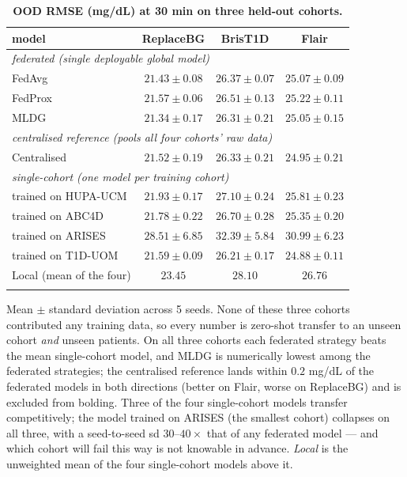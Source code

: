 \documentclass[10pt,letterpaper]{article}
\newlength\savedwidth
\newcommand\thickhline{\noalign{\global\savedwidth\arrayrulewidth\global\arrayrulewidth 2pt}%
\hline
\noalign{\global\arrayrulewidth\savedwidth}}
\begin{document}
\begin{table}[!ht]
\centering
\captionsetup{justification=centering,singlelinecheck=on}
\caption{\bf OOD RMSE (mg/dL) at 30 min on three held-out cohorts.}
\label{tab:ood}
\begin{tabular}{lccc}
\thickhline
model & ReplaceBG & BrisT1D & Flair \\
\hline
\multicolumn{4}{l}{\emph{federated (single deployable global model)}} \\
FedAvg  & $21.43 \pm 0.08$ & $26.37 \pm 0.07$ & $25.07 \pm 0.09$ \\
FedProx & $21.57 \pm 0.06$ & $26.51 \pm 0.13$ & $25.22 \pm 0.11$ \\
MLDG    & $\mathbf{21.34 \pm 0.17}$ & $\mathbf{26.31 \pm 0.21}$ & $\mathbf{25.05 \pm 0.15}$ \\
\hline
\multicolumn{4}{l}{\emph{centralised reference (pools all four cohorts' raw data)}} \\
Centralised & $21.52 \pm 0.19$ & $26.33 \pm 0.21$ & $24.95 \pm 0.21$ \\
\hline
\multicolumn{4}{l}{\emph{single-cohort (one model per training cohort)}} \\
\;trained on HUPA-UCM & $21.93 \pm 0.17$ & $27.10 \pm 0.24$ & $25.81 \pm 0.23$ \\
\;trained on ABC4D    & $21.78 \pm 0.22$ & $26.70 \pm 0.28$ & $25.35 \pm 0.20$ \\
\;trained on ARISES   & $28.51 \pm 6.85$ & $32.39 \pm 5.84$ & $30.99 \pm 6.23$ \\
\;trained on T1D-UOM  & $21.59 \pm 0.09$ & $26.21 \pm 0.17$ & $24.88 \pm 0.11$ \\
Local (mean of the four) & $23.45$ & $28.10$ & $26.76$ \\
\thickhline
\end{tabular}
\begin{center}
{\small Mean $\pm$ standard deviation across 5 seeds. None of these three cohorts
contributed any training data, so every number is zero-shot transfer to an unseen
cohort \emph{and} unseen patients. On all three cohorts each federated strategy
beats the mean single-cohort model, and MLDG is numerically lowest among the
federated strategies; the centralised reference lands within $0.2$ mg/dL of the
federated models in both directions (better on Flair, worse on ReplaceBG) and is
excluded from bolding. Three of the
four single-cohort models transfer competitively; the model trained on ARISES
(the smallest cohort) collapses on all three, with a seed-to-seed sd $30$--$40
\times$ that of any federated model --- and which cohort will fail this way is not
knowable in advance. \emph{Local} is the unweighted mean of the four
single-cohort models above it.}
\end{center}
\end{table}
\end{document}
